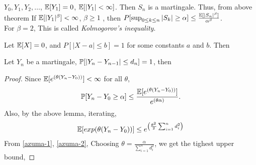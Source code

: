 \documentclass[all-lectures.tex]{subfiles}
\begin{document}
\begin{exmp}
$Y_0, Y_1, Y_2, \dots$, $\E[Y_1] = 0$, $\E[|Y_1| < \infty]$. Then $S_n$ is a martingale. Thus, from above theorem
If $\E[|Y_1|^\beta] < \infty$, $\beta \ge 1$  , then  $P[\sup_{0 \le k \le n} |S_k| \ge \alpha]  \le \frac{\E[|S_n|^\beta]}{\alpha^\beta}$.\\
For $\beta = 2$, 
This is called \textit{Kolmogorov's inequality}.
\end{exmp}

\begin{lem}
Let $\E[X]=0$, and $P[|X-a| \le b] = 1$ for some constants $a$ and $b$. Then
\end{lem}

\begin{thm}
Let $Y_n$ be a martingale, $\P[|Y_n - Y_{n-1}| \le d_n] = 1$, then
\end{thm}
\begin{proof}
	Since $\E[e^{(\theta (Y_n - Y_0))}] < \infty$ for all $\theta$,
\begin{align}
\label{azuma-1}
\P[Y_n-Y_0 \ge \alpha] \le\frac{ \E[e^{(\theta (Y_n -Y_0))}]}{e^{(\theta \alpha)}}.
\end{align}
Also,
by the above lemma, iterating, 
\begin{align}
\label{azuma-2}
\E[exp(\theta (Y_n - Y_0))] \le e^{\left(\frac{\theta^2}{2} \sum_{i=1}^{n} d^2_i\right)}
\end{align}
From \ref{azuma-1}, \ref{azuma-2},
Choosing $\theta = \frac{\alpha}{\sum_{i=1}^{n} d^2_i}$, we get the tighest upper bound,
\end{proof}
\end{document}
